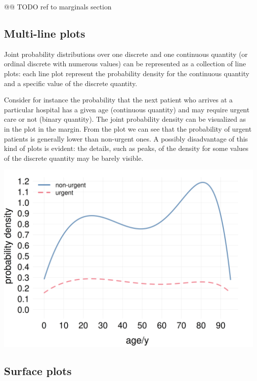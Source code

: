 \documentclass[
  a4paper,
  DIV=11,
  numbers=noendperiod,
  oneside]{scrreprt}
\begin{document}
@@ TODO ref to marginals section

\hypertarget{multi-line-plots}{%
\subsection{Multi-line plots}\label{multi-line-plots}}

Joint probability distributions over one discrete and one continuous
quantity (or ordinal discrete with numerous values) can be represented
as a collection of line plots: each line plot represent the probability
density for the continuous quantity and a specific value of the discrete
quantity.

Consider for instance the probability that the next patient who arrives
at a particular hospital has a given age (continuous quantity) and may
require urgent care or not (binary quantity). The joint probability
density can be visualized as in the plot in the margin. From the plot we
can see that the probability of urgent patients is generally lower than
non-urgent ones. A possibly disadvantage of this kind of plots is
evident: the details, such as peaks, of the density for some values of
the discrete quantity may be barely visible.

\begin{marginfigure}

{\centering \includegraphics[width=1\textwidth,height=\textheight]{hospital_age_urgent.png}

}

\end{marginfigure}

\hypertarget{surface-plots}{%
\subsection{Surface plots}\label{surface-plots}}
\end{document}
